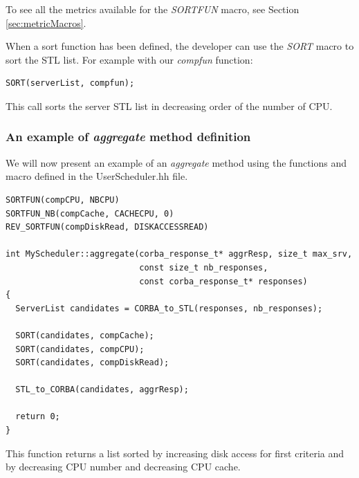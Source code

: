 To see all the metrics available for the \textit{SORTFUN} macro, see Section
\ref{sec:metricMacros}.

When a sort function has been defined, the developer can use the \textit{SORT}
macro to sort the STL list. For example with our \textit{compfun} function:
\begin{verbatim}
SORT(serverList, compfun);
\end{verbatim}
This call sorts the server STL list in decreasing order of the number of CPU.

\subsubsection{An example of \textit{aggregate} method definition}
We will now present an example of an \textit{aggregate} method using the
functions and macro defined in the UserScheduler.hh file.
\begin{verbatim}
SORTFUN(compCPU, NBCPU)
SORTFUN_NB(compCache, CACHECPU, 0)
REV_SORTFUN(compDiskRead, DISKACCESSREAD)

int MyScheduler::aggregate(corba_response_t* aggrResp, size_t max_srv,
                           const size_t nb_responses,
                           const corba_response_t* responses)
{
  ServerList candidates = CORBA_to_STL(responses, nb_responses);

  SORT(candidates, compCache);
  SORT(candidates, compCPU);
  SORT(candidates, compDiskRead);

  STL_to_CORBA(candidates, aggrResp);

  return 0;
}
\end{verbatim}
This function returns a list sorted by increasing disk access for first criteria
and by decreasing CPU number and decreasing CPU cache.

